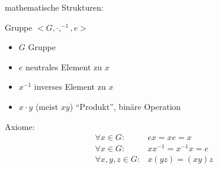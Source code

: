 mathematische Strukturen:\\
\begin{center}
\end{center}
\begin{definition}
	Gruppe $<G,\cdot, ^{-1},e>$
	\begin{itemize}
		\item $G$ Gruppe
		\item $e$ neutrales Element zu $x$
		\item $x^{-1}$ inverses Element zu $x$
		\item $x\cdot y$ (meist $xy$) ``Produkt'', binäre Operation
	\end{itemize}
	Axiome:
	\begin{align*}
		\forall x \in G \colon& ex = xe = x\\
		\forall x \in G \colon& x x^{-1} = x^{-1}x = e\\
		\forall x,y,z \in G \colon& x(yz) = (xy)z
	\end{align*}
\end{definition}
